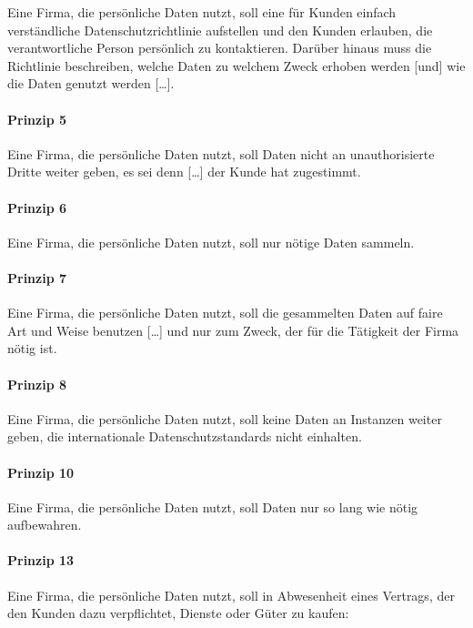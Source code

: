 Eine Firma, die persönliche Daten nutzt, soll eine für Kunden einfach verständliche Datenschutzrichtlinie aufstellen und den Kunden erlauben, die verantwortliche Person persönlich zu kontaktieren.
Darüber hinaus muss die Richtlinie beschreiben, welche Daten zu welchem Zweck erhoben werden [und] wie die Daten genutzt werden [\dots].

\paragraph*{Prinzip 5}

Eine Firma, die persönliche Daten nutzt, soll Daten nicht an unauthorisierte Dritte weiter geben, es sei denn [\dots] der Kunde hat zugestimmt.

\paragraph*{Prinzip 6}

Eine Firma, die persönliche Daten nutzt, soll nur nötige Daten sammeln.

\paragraph*{Prinzip 7}

Eine Firma, die persönliche Daten nutzt, soll die gesammelten Daten auf faire Art und Weise benutzen [\dots] und nur zum Zweck, der für die Tätigkeit der Firma nötig ist.

\paragraph*{Prinzip 8}

Eine Firma, die persönliche Daten nutzt, soll keine Daten an Instanzen weiter geben, die internationale Datenschutzstandards nicht einhalten.

\paragraph*{Prinzip 10}

Eine Firma, die persönliche Daten nutzt, soll Daten nur so lang wie nötig aufbewahren.

\paragraph*{Prinzip 13}

Eine Firma, die persönliche Daten nutzt, soll in Abwesenheit eines Vertrags, der den Kunden dazu verpflichtet, Dienste oder Güter zu kaufen:

